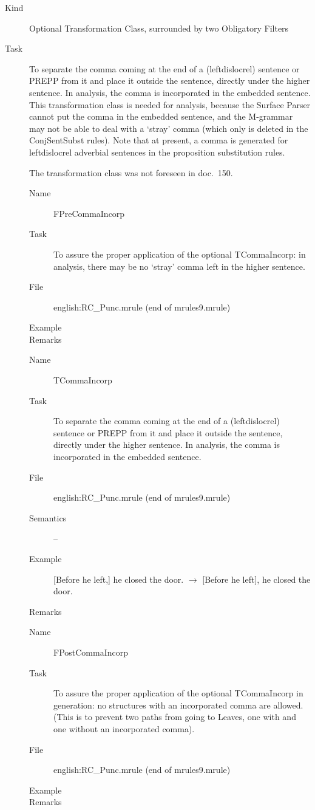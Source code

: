 \begin{description}
\item[Kind] Optional Transformation Class, surrounded by two Obligatory Filters
\item[Task] To separate the comma coming at the end of a (leftdislocrel) 
sentence or PREPP from it and place it outside the sentence, directly under the 
higher sentence. In analysis, the 
comma is incorporated in the embedded sentence. This transformation class is 
needed for 
analysis, because the Surface Parser cannot put the comma in the embedded 
sentence, and the M-grammar may not be able to deal with a `stray' comma 
(which only is 
deleted in the ConjSentSubst rules). Note that at present, a
comma is generated for leftdislocrel adverbial sentences in the proposition 
substitution rules. 

The transformation class was not foreseen in doc.\ 150.

\vspace{1 cm}
\begin{description}
\item[Name] FPreCommaIncorp
\item[Task] To assure the proper application of the optional TCommaIncorp: in 
analysis, there may be no `stray' comma left in the higher sentence.
\item[File] english:RC\_Punc.mrule (end of mrules9.mrule)
\item[Example] 
\item[Remarks]
\end{description}

\vspace{1 cm}
\begin{description}
\item[Name] TCommaIncorp
\item[Task] To separate the comma coming at the end of a (leftdislocrel) 
sentence or PREPP from it and place it outside the sentence, directly under the 
higher sentence. In analysis, the 
comma is incorporated in the embedded sentence. 
\item[File] english:RC\_Punc.mrule (end of mrules9.mrule)
\item[Semantics] --
\item[Example] [Before he left,] he closed the door. $\rightarrow$ [Before he 
left], he closed the door.
\item[Remarks]
\end{description}

\vspace{1 cm}
\begin{description}
\item[Name] FPostCommaIncorp
\item[Task] To assure the proper application of the optional TCommaIncorp in 
generation: no structures with an incorporated comma are allowed. (This is to 
prevent two paths from going to Leaves, one with and one without an 
incorporated comma).
\item[File] english:RC\_Punc.mrule (end of mrules9.mrule)
\item[Example] 
\item[Remarks]
\end{description}

\end{description}


